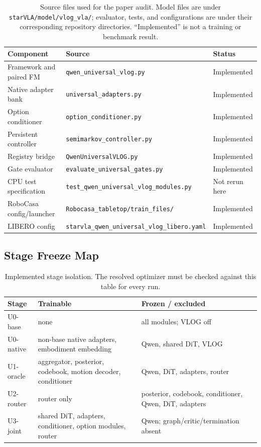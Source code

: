 \begin{table}[h]
\centering
\scriptsize
\setlength{\tabcolsep}{4pt}
\begin{tabular}{p{}p{}p{}}
\toprule
Component & Source & Status \\
\midrule
Framework and paired FM & \texttt{qwen\_universal\_vlog.py} & Implemented \\
Native adapter bank & \texttt{universal\_adapters.py} & Implemented \\
Option conditioner & \texttt{option\_conditioner.py} & Implemented \\
Persistent controller & \texttt{semimarkov\_controller.py} & Implemented \\
Registry bridge & \texttt{QwenUniversalVLOG.py} & Implemented \\
Gate evaluator & \texttt{evaluate\_universal\_gates.py} & Implemented \\
CPU test specification & \texttt{test\_qwen\_universal\_vlog\_modules.py} & Not rerun here \\
RoboCasa config/launcher & \texttt{Robocasa\_tabletop/train\_files/} & Implemented \\
LIBERO config & \texttt{starvla\_qwen\_universal\_vlog\_libero.yaml} & Implemented \\
\bottomrule
\end{tabular}
\caption{Source files used for the paper audit.  Model files are under
\texttt{starVLA/model/vlog\_vla/}; evaluator, tests, and configurations are
under their corresponding repository directories.  ``Implemented'' is not a
training or benchmark result.}
\label{tab:source-map}
\end{table}

\subsection{Stage Freeze Map}

\begin{table}[h]
\centering
\scriptsize
\setlength{\tabcolsep}{4pt}
\begin{tabular}{p{}p{}p{}}
\toprule
Stage & Trainable & Frozen / excluded \\
\midrule
U0-base & none & all modules; VLOG off \\
U0-native & non-base native adapters, embodiment embedding & Qwen, shared DiT, VLOG \\
U1-oracle & aggregator, posterior, codebook, motion decoder, conditioner & Qwen, DiT, adapters, router \\
U2-router & router only & posterior, codebook, conditioner, Qwen, DiT, adapters \\
U3-joint & shared DiT, adapters, conditioner, option modules, router & Qwen; graph/critic/termination absent \\
\bottomrule
\end{tabular}
\caption{Implemented stage isolation.  The resolved optimizer must be checked
against this table for every run.}
\label{tab:stage-freeze}
\end{table}

